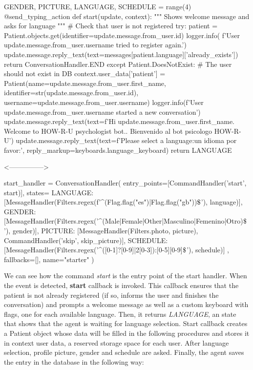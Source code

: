 \documentclass[12pt,english]{article}
\newcommand{\dollar}{\mbox{\textdollar}}
\begin{document}
\begin{python}[caption={Patient start callback}, captionpos=b]
GENDER, PICTURE, LANGUAGE, SCHEDULE = range(4)
@send_typing_action
def start(update, context):
    """
    Shows welcome message and asks for language
    """
    # Check that user is not registered
    try:
        patient = Patient.objects.get(identifier=update.message.from_user.id)
        logger.info(
            f'User {update.message.from_user.username} tried to register again.')
        update.message.reply_text(text=messages[patient.language]['already_exists'])
        return ConversationHandler.END
    except Patient.DoesNotExist:
        # The user should not exist in DB
        context.user_data['patient'] = Patient(name=update.message.from_user.first_name, identifier=str(update.message.from_user.id), username=update.message.from_user.username)
        logger.info(f'User {update.message.from_user.username} started a new conversation')
        update.message.reply_text(text=f'Hi {update.message.from_user.first_name}. Welcome to HOW-R-U psychologist bot.. Bienvenido al bot psicologo HOW-R-U')
        update.message.reply_text(text=f'Please select a language:\nElija un idioma por favor:', reply_markup=keyboards.language_keyboard)
    return LANGUAGE

  <--------------->

  start_handler = ConversationHandler(
      entry_points=[CommandHandler('start', start)],
      states={
          LANGUAGE: [MessageHandler(Filters.regex(f'^({Flag.flag("es")}|{Flag.flag("gb")})$\dollar$'), language)],
          GENDER: [MessageHandler(Filters.regex('^(Male|Female|Other|Masculino|Femenino|Otro)$\dollar$'), gender)],
          PICTURE: [MessageHandler(Filters.photo, picture), CommandHandler('skip', skip_picture)],
          SCHEDULE: [MessageHandler(Filters.regex('^([0-1]?[0-9]|2[0-3]):[0-5][0-9]$\dollar$'), schedule)]
      },
      fallbacks=[],
      name="starter"
  )
\end{python}

We can see how the command \emph{start} is the entry point of the start handler. When the event is detected, \textbf{start} callback is invoked. This callback ensures that the patient is not already registered (if so, informs the user and finishes the conversation) and prompts a welcome message as well as a custom keyboard with flags, one for each available language. Then, it returns \emph{LANGUAGE}, an state that shows that the agent is waiting for language selection. Start callback creates a Patient object whose data will be filled in the following procedures and stores it in context user data, a reserved storage space for each user. After language selection, profile picture, gender and schedule are asked. Finally, the agent saves the entry in the database in the following way:
\end{document}
